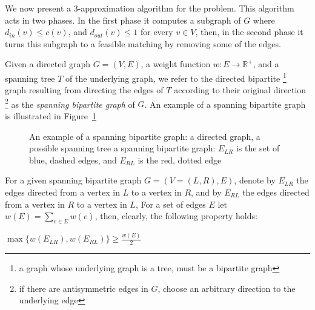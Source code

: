 \label{sub:cm}
We now present a 3-app\-roximation algorithm for the \textsc{\CARPOOL{}} problem.
This algorithm acts in two phases.
In the first phase it computes a subgraph of $G$ 
where $d_{in}(v) \leq c(v)$, and $d_{out}(v) \leq 1$ for every $v \in V$, 
then, in the second phase it turns this subgraph to a feasible matching
by removing some of the edges.

Given a directed graph $G = (V, E)$,
a weight function $w : E \rightarrow \mathbb{R^+}$, 
and a spanning tree $T$ of the underlying graph, 
we refer to the directed bipartite
\footnote{a graph whose underlying graph is a tree, must be a bipartite graph}
graph resulting from directing the edges 
of $T$ according to their original direction
\footnote{if there are antisymmetric edges in $G$, 
choose an arbitrary direction to the underlying edge}
as the \emph{spanning bipartite graph} of $G$.
An example of a spanning bipartite graph is illustrated in 
Figure~\ref{fig:spanning-bipartite-graph}

\begin{figure}
\centering

\caption{
\label{fig:spanning-bipartite-graph}
An example of a spanning bipartite graph:
 a directed graph, 
 a possible spanning tree  
 a spanning bipartite graph:
$E_{LR}$ is the set of blue, dashed edges, 
and $E_{RL}$ is the red, dotted edge   
}
\end{figure}

For a given spanning bipartite graph $G = (V = (L, R), E)$, 
denote by $E_{LR}$ the edges directed from a vertex in $L$ to a vertex in $R$,
and by $E_{RL}$ the edges directed from a vertex in $R$ to a vertex in $L$,
For a set of edges $E$ let $w(E) = \sum_{e \in E}{w(e)}$, 
then, clearly, the following property holds:

\begin{observation}
\label{ob:geq_half}
$ \max\{w(E_{LR}), w(E_{RL})\}  \geq \frac{w(E)}{2} $
\end{observation}


